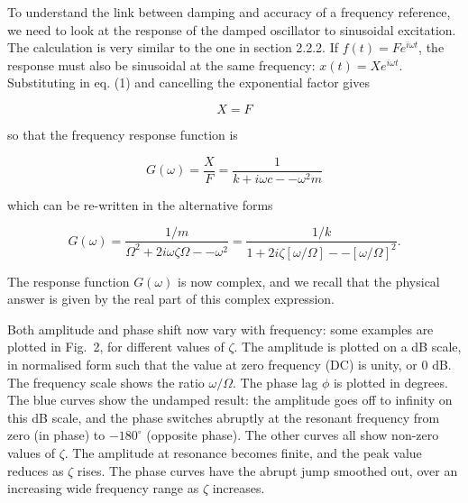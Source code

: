   To understand the link between damping and accuracy of a frequency reference, 
  we need to look at the response of the damped oscillator to sinusoidal 
  excitation. The calculation is very similar to the one in section 2.2.2. If 
  $f(t)=F e^{i \omega t}$, the response must also be sinusoidal at the same 
  frequency: $x(t) = Xe^{i \omega t}$. Substituting in eq. (1) and cancelling 
  the exponential factor gives 

  \begin{equation*}[-\omega^2 m + i \omega c +k]X=F \tag{9}\end{equation*} 

  \noindent{}so that the frequency response function is 

  \begin{equation*}G(\omega) = \frac{X}{F} = \frac{1}{k+i \omega c -- \omega^2 
  m} \tag{10} \end{equation*} 

  \noindent{}which can be re-written in the alternative forms 

  \begin{equation*}G(\omega) = \frac{1/m}{\Omega^2+2i \omega \zeta \Omega -- 
  \omega^2 }= \frac{1/k}{1+2i \zeta [\omega/\Omega] -- [\omega/\Omega]^2 }. 
  \tag{11} \end{equation*} 

  The response function $G(\omega)$ is now complex, and we recall that the 
  physical answer is given by the real part of this complex expression. 



  Both amplitude and phase shift now vary with frequency: some examples are 
  plotted in Fig.\ 2, for different values of $\zeta$. The amplitude is plotted 
  on a dB scale, in normalised form such that the value at zero frequency (DC) 
  is unity, or 0 dB. The frequency scale shows the ratio $\omega/\Omega$. The 
  phase lag $\phi$ is plotted in degrees. The blue curves show the undamped 
  result: the amplitude goes off to infinity on this dB scale, and the phase 
  switches abruptly at the resonant frequency from zero (in phase) to 
  $-180^\circ$ (opposite phase). The other curves all show non-zero values of 
  $\zeta$. The amplitude at resonance becomes finite, and the peak value 
  reduces as $\zeta$ rises. The phase curves have the abrupt jump smoothed out, 
  over an increasing wide frequency range as $\zeta$ increases. 

